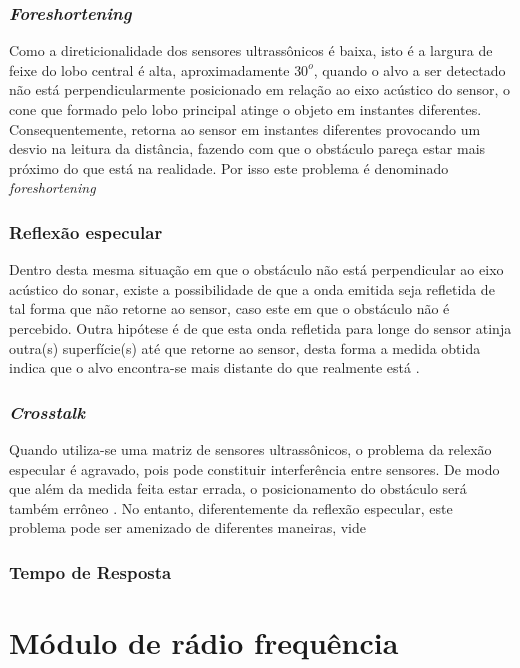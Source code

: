\subsubsection{\textit{Foreshortening}}
Como a direticionalidade dos sensores ultrassônicos é baixa, isto é a largura de feixe do lobo central é alta, aproximadamente $30^o$, quando o alvo 
a ser detectado não está perpendicularmente posicionado em relação ao eixo acústico do sensor, o cone que formado pelo lobo principal atinge o objeto 
em instantes diferentes. Consequentemente, retorna ao sensor em instantes diferentes provocando um desvio na leitura da distância, fazendo com que o 
obstáculo pareça estar mais próximo do que está na realidade. Por isso este problema é denominado \textit{foreshortening}

\subsubsection{Reflexão especular}
Dentro desta mesma situação em que o obstáculo não está perpendicular ao eixo acústico do sonar, existe a possibilidade de que a onda emitida seja 
refletida de tal forma que não retorne ao sensor, caso este em que o obstáculo não é percebido. Outra hipótese é de que esta onda refletida 
para longe do sensor atinja outra(s) superfície(s) até que retorne ao sensor, desta forma a medida obtida indica que o alvo encontra-se mais distante 
do que realmente está \cite{roseli,siegwart,everett}.  

\subsubsection{\textit{Crosstalk}}
Quando utiliza-se uma matriz de sensores ultrassônicos, o problema da relexão especular é agravado, pois pode constituir interferência entre 
sensores. De modo que além da medida feita estar errada, o posicionamento do obstáculo será também errôneo \cite{murphy}. No entanto, diferentemente 
da reflexão especular, este problema pode ser amenizado de diferentes maneiras, vide \cite{2016_artigo_1,2016_artigo_5}

\subsubsection{Tempo de Resposta} %


\section{Módulo de rádio frequência}

